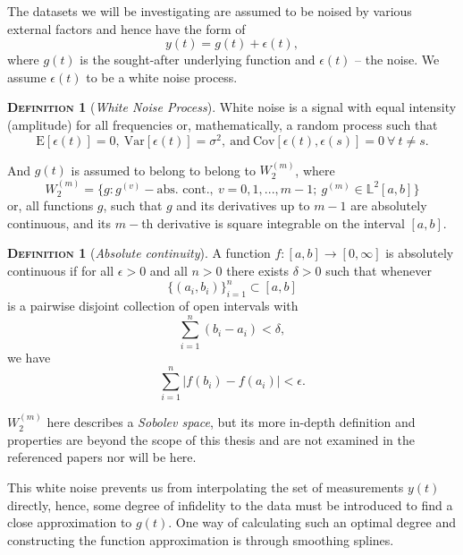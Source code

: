 \documentclass[11pt,leqno]{book}
\theoremstyle{definition}
\theoremstyle{plain}
\theoremstyle{definition}
\newtheorem{definition}[theorem]{\scshape{Definition}}
\begin{document}
{The datasets we will be investigating are assumed to be noised by various external factors and hence have the form of 
\begin{equation*}
    {y}(t) = {g}(t) + {\epsilon}(t),
\end{equation*}
where ${g}(t)$ is the sought-after underlying function and ${\epsilon}(t)$ -- the noise. We assume $\epsilon(t)$ to be a white noise process. 
\begin{definition}[\textit{White Noise Process}] White noise is a signal with equal intensity (amplitude) for all frequencies or, mathematically, a random process such that \begin{equation*}
    \text{E}[{\epsilon}(t)]= 0, \: \text{Var}[{\epsilon}(t)] = \sigma^2, \: \text{and} \:\text{Cov}[{\epsilon}(t), {\epsilon}(s)] = 0\: \forall \: t \neq s.
\end{equation*} 
\end{definition}
\noindent And ${g}(t)$ is assumed to belong to belong to $W_2^{(m)}$, where
\begin{equation*}
    W_2^{(m)} = \{g: g^{(v)} - \text{abs. cont.},\: v = 0, 1,..., m-1;\: g^{(m)} \in \mathbb{L}^2[a,b]\}
\end{equation*}
or, all functions $g$, such that $g$ and its derivatives up to $m-1$ are absolutely continuous, and its $m-$th derivative is square integrable on the interval $[a, b]$.
\begin{definition}[\textit{Absolute continuity}]
A function \(f:[a,b]\to[0,\infty]\) is absolutely continuous if for all \(\epsilon>0\) and all \(n>0\) there exists \(\delta>0\) such that whenever
\[
\{(a_i,b_i)\}_{i=1}^n \subset [a,b]
\]
is a pairwise disjoint collection of open intervals with
\[
\sum_{i=1}^n (b_i-a_i)<\delta,
\]
we have
\[
\sum_{i=1}^n \lvert f(b_i)-f(a_i)\rvert < \epsilon.
\]
\end{definition}
\noindent $W_2^{(m)}$ here describes a \textit{Sobolev space}, but its more in-depth definition and properties are beyond the scope of this thesis and are not examined in the referenced papers nor will be here.

This white noise prevents us from interpolating the set of measurements $y(t)$ directly, hence, some degree of infidelity to the data must be introduced to find a close approximation to $g(t)$. One way of calculating such an optimal degree and constructing the function approximation is through smoothing splines.

}
\end{document}
